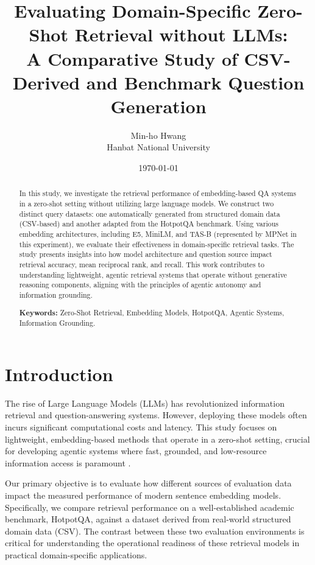 \documentclass[11pt, a4paper]{article}
\title{\textbf{Evaluating Domain-Specific Zero-Shot Retrieval without LLMs:} \\ A Comparative Study of CSV-Derived and Benchmark Question Generation}
\author{Min-ho Hwang \\ \small Hanbat National University}
\date{\today} %
\begin{document}
\maketitle %
\thispagestyle{empty} %

\begin{abstract}
\noindent In this study, we investigate the retrieval performance of embedding-based QA systems in a zero-shot setting without utilizing large language models. We construct two distinct query datasets: one automatically generated from structured domain data (CSV-based) and another adapted from the HotpotQA benchmark. Using various embedding architectures, including E5, MiniLM, and TAS-B (represented by MPNet in this experiment), we evaluate their effectiveness in domain-specific retrieval tasks. The study presents insights into how model architecture and question source impact retrieval accuracy, mean reciprocal rank, and recall. This work contributes to understanding lightweight, agentic retrieval systems that operate without generative reasoning components, aligning with the principles of agentic autonomy and information grounding.

\vspace{0.5cm} %
\noindent\textbf{Keywords:} Zero-Shot Retrieval, Embedding Models, HotpotQA, Agentic Systems, Information Grounding.
\end{abstract}

\newpage %
\section{Introduction}

The rise of Large Language Models (LLMs) has revolutionized information retrieval and question-answering systems. However, deploying these models often incurs significant computational costs and latency. This study focuses on lightweight, embedding-based methods that operate in a zero-shot setting, crucial for developing agentic systems where fast, grounded, and low-resource information access is paramount \cite{ref:agentic_systems}.

Our primary objective is to evaluate how different sources of evaluation data impact the measured performance of modern sentence embedding models. Specifically, we compare retrieval performance on a well-established academic benchmark, HotpotQA, against a dataset derived from real-world structured domain data (CSV). The contrast between these two evaluation environments is critical for understanding the operational readiness of these retrieval models in practical domain-specific applications.
\end{document}
